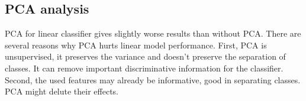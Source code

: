 \documentclass[conference]{IEEEtran}
\begin{document}
\subsection{PCA analysis}


\begin{table}[h]
\centering
\caption{Linear model performance with PCA-reduced features.}
\label{tab:linear_model_pca}
\end{table}


PCA for linear classifier gives slightly worse results than without PCA.
There are several reasons why PCA hurts linear model performance. 
First, PCA is unsupervised, it preserves the variance and doesn't preserve the separation of classes.
It can remove important discriminative information for the classifier.
Second, the used features may already be informative, good in separating classes.
PCA might delute their effects. 

\end{document}
